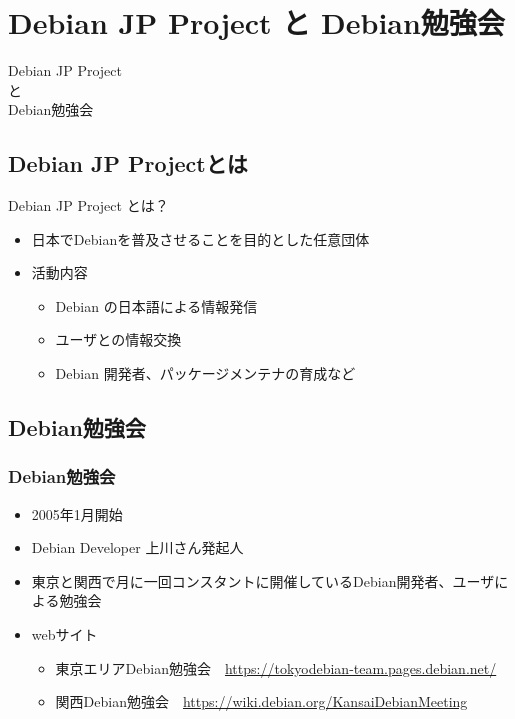 

\section{Debian JP Project と Debian勉強会}


\begin{frame}
  \begin{center}\Huge{Debian JP Project\\と\\Debian勉強会}\end{center}
\end{frame}

\subsection{Debian JP Projectとは}
  
\begin{frame}{Debian JP Project とは？}

\begin{itemize}
  \item 日本でDebianを普及させることを目的とした任意団体
  \item 活動内容
  \begin{itemize}
    \item Debian の日本語による情報発信
    \item ユーザとの情報交換
    \item Debian 開発者、パッケージメンテナの育成など
  \end{itemize}
\end{itemize}

\end{frame}

\subsection{Debian勉強会}

\begin{frame}
  
\frametitle{Debian勉強会}
\begin{itemize}
 \item 2005年1月開始
 \item Debian Developer 上川さん発起人
 \item 東京と関西で月に一回コンスタントに開催しているDebian開発者、ユーザによる勉強会
 \item webサイト
   \begin{itemize}
   \item 東京エリアDebian勉強会　\url{https://tokyodebian-team.pages.debian.net/}
   \item 関西Debian勉強会　\url{https://wiki.debian.org/KansaiDebianMeeting}
   \end{itemize}
\end{itemize}

\end{frame}


